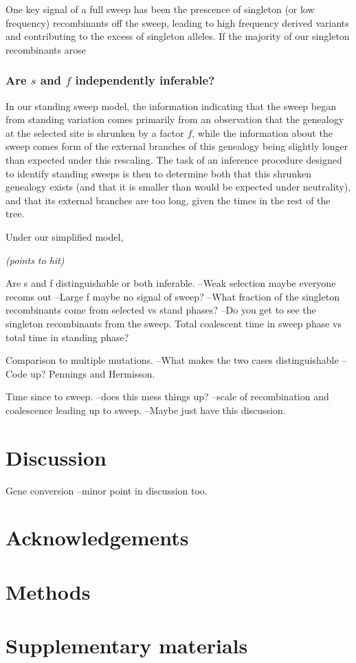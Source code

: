\documentclass[a4paper,10pt]{article}
\newcommand{\gc}[1]{{\it \color{red} (#1)} }
\begin{document}
One key signal of a full sweep has been the prescence of singleton (or low frequency) recombinants off the sweep, leading to high frequency derived variants and contributing to the excess of singleton alleles. If the majority of our singleton recombinants arose


\subsubsection{Are $s$ and $f$ independently inferable?}

In our standing sweep model, the information indicating that the sweep began from standing variation comes primarily from an observation that the genealogy at the selected site is shrunken by a factor $f$, while the information about the sweep comes form of the external branches of this genealogy being slightly longer than expected under this rescaling. The task of an inference procedure designed to identify standing sweeps is then to determine both that this shrunken genealogy exists (and that it is smaller than would be expected under neutrality), and that its external branches are too long, given the times in the rest of the tree.

Under our simplified model, 

\gc{points to hit}

Are s and f distinguishable or both inferable.
--Weak selection maybe everyone recoms out
--Large f maybe no signal of sweep?
--What fraction of the singleton recombinants come from selected vs stand phases?
--Do you get to see the singleton recombinants from the sweep. Total coalescent time in sweep phase vs total time in standing phase?

Comparison to multiple mutations. 
--What makes the two cases distinguishable
--Code up? Pennings and Hermisson.


Time since to sweep. 
--does this mess things up?
--scale of recombination and coalescence leading up to sweep.
--Maybe just have this discussion.


\section{Discussion}

Gene conversion --minor point in discussion too. 


\section{Acknowledgements}

\section{Methods}





\section{Supplementary materials}

\setcounter{table}{0}
\renewcommand{\thetable}{S\arabic{table}}
\setcounter{figure}{0}
\renewcommand{\thefigure}{S\arabic{figure}}
\end{document}
